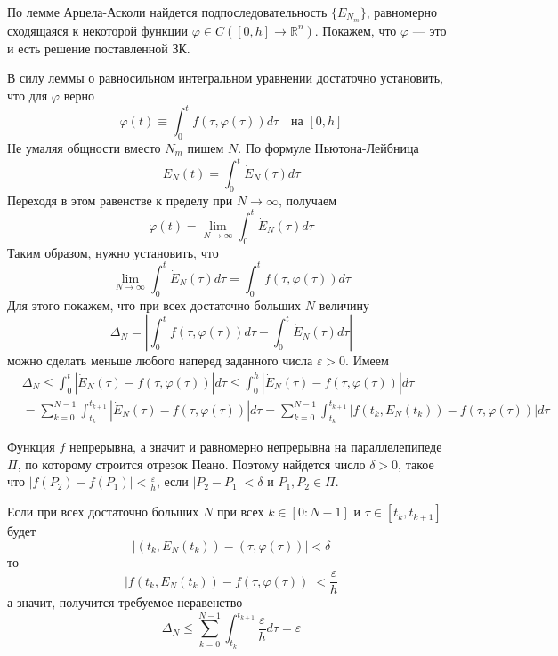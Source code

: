 \documentclass{article}
\begin{document}
По лемме Арцела-Асколи найдется подпоследовательность $\{E_{N_m}\}$, равномерно сходящаяся к некоторой функции $\varphi \in C([0,h] \to \mathbb{R}^n)$. Покажем, что $\varphi$ --- это и есть решение поставленной ЗК.

В силу леммы о равносильном интегральном уравнении достаточно установить, что для $\varphi$ верно
\begin{equation*}
    \varphi(t) \equiv \int_{0}^{t} f(\tau, \varphi(\tau))d\tau \quad \text{на } [0,h]
\end{equation*}
Не умаляя общности вместо $N_m$ пишем $N$. По формуле Ньютона-Лейбница
\begin{equation*}
    E_N(t) = \int_{0}^{t} \dot{E}_N(\tau)d\tau
\end{equation*}
Переходя в этом равенстве к пределу при $N \to \infty$, получаем
\begin{equation*}
    \varphi(t) = \lim_{N \to \infty} \int_{0}^{t}\dot{E}_N(\tau)d\tau
\end{equation*}
Таким образом, нужно установить, что
\begin{equation*}
    \lim_{N \to \infty} \int_{0}^{t}\dot{E}_N(\tau)d\tau = \int_{0}^{t}f(\tau, \varphi(\tau))d\tau
\end{equation*}
Для этого покажем, что при всех достаточно больших $N$ величину
\begin{equation*}
    \Delta_N = \left|\int_{0}^{t}f(\tau, \varphi(\tau))d\tau - \int_{0}^{t}\dot{E}_N(\tau)d\tau\right|
\end{equation*}
можно сделать меньше любого наперед заданного числа $\varepsilon > 0$. Имеем
\begin{equation*}
    \begin{aligned}
        &\Delta_N \le \int_{0}^{t}|\dot{E}_N(\tau) - f(\tau, \varphi(\tau))|d\tau \le \int_{0}^{h}|\dot{E}_N(\tau) - f(\tau, \varphi(\tau))|d\tau\\
        &=\sum_{k=0}^{N-1}\int_{t_k}^{t_{k+1}}|\dot{E}_N(\tau) - f(\tau, \varphi(\tau))|d\tau = \sum_{k=0}^{N-1}\int_{t_k}^{t_{k+1}}|f(t_k, E_N(t_k)) - f(\tau, \varphi(\tau))|d\tau
    \end{aligned}
\end{equation*}

Функция $f$ непрерывна, а значит и равномерно непрерывна на параллелепипеде $\Pi$, по которому строится отрезок Пеано. Поэтому найдется число $\delta > 0$, такое что $|f(P_2) - f(P_1)| < \frac{\varepsilon}{h}$, если $|P_2 - P_1| < \delta$ и $P_1, P_2 \in \Pi$.

Если при всех достаточно больших $N$ при всех $k \in [0 : N - 1]$ и $\tau \in [t_k, t_{k+1}]$ будет
\begin{equation}
    |(t_k, E_N(t_k)) - (\tau, \varphi(\tau))| < \delta \label{eulerineq}
\end{equation}
то
\begin{equation*}
    |f(t_k, E_N(t_k)) - f(\tau, \varphi(\tau))| < \frac{\varepsilon}{h}
\end{equation*}
а значит, получится требуемое неравенство
\begin{equation*}
    \Delta_N \le \sum_{k=0}^{N-1}\int_{t_k}^{t_{k+1}}\frac{\varepsilon}{h}d\tau = \varepsilon
\end{equation*}
\end{document}
